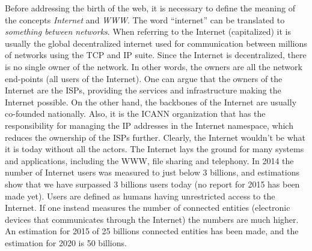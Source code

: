 \documentclass[a4paper,11pt]{kth-mag}
\begin{document}
      Before addressing the birth of the \gls{web}, it is necessary to define the meaning of the concepts \emph{Internet} and \emph{\gls{WWW}}.
      The word ``internet'' can be translated to \emph{something between networks}.
      When referring to the Internet (capitalized) it is usually the global decentralized internet used for communication between millions of networks using the \gls{TCP} and \gls{IP} suite.
      Since the Internet is decentralized, there is no single owner of the network.
      In other words, the owners are all the network end-points (all users of the Internet).
      One can argue that the owners of the Internet are the \glspl{ISP}, providing the services and infrastructure making the Internet possible.
      On the other hand, the backbones of the Internet are usually co-founded nationally.
      Also, it is the \gls{ICANN} organization that has the responsibility for managing the \gls{IP} addresses in the Internet namespace, which reduces the ownership of the \glspl{ISP} further.
      Clearly, the Internet wouldn't be what it is today without all the actors.
      The Internet lays the ground for many systems and applications, including the \gls{WWW}, file sharing and telephony.
      In 2014 the number of Internet users was measured to just below 3 billions, and estimations show that we have surpassed 3 billions users today (no report for 2015 has been made yet).
      Users are defined as humans having unrestricted access to the Internet.
      If one instead measures the number of connected entities (electronic devices that communicates through the Internet) the numbers are much higher.
      An estimation for 2015 of 25 billions connected entities has been made, and the estimation for 2020 is 50 billions.
      
\end{document}

